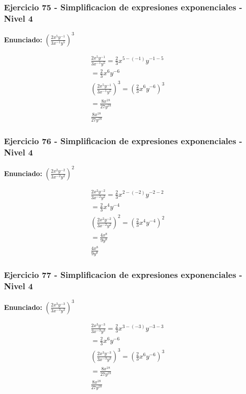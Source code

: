 \documentclass[12pt,a4paper]{article}
\begin{document}
\subsubsection*{Ejercicio 75 - Simplificacion de expresiones exponenciales - Nivel 4}
\textbf{Enunciado:} \(\left(\frac{2x^{5}y^{-1}}{3x^{-1}y^{5}}\right)^{3}\)

\[
\begin{aligned}
\frac{2x^{5}y^{-1}}{3x^{-1}y^{5}}=\frac{2}{3}x^{5-(-1)}y^{-1-5}\\
=\frac{2}{3}x^{6}y^{-6}\\
\left(\frac{2x^{5}y^{-1}}{3x^{-1}y^{5}}\right)^{3}=\left(\frac{2}{3}x^{6}y^{-6}\right)^{3}\\
=\frac{8x^{18}}{27y^{18}}\\
\boxed{\frac{8x^{18}}{27y^{18}}}
\end{aligned}
\]


\subsubsection*{Ejercicio 76 - Simplificacion de expresiones exponenciales - Nivel 4}
\textbf{Enunciado:} \(\left(\frac{2x^{2}y^{-2}}{3x^{-2}y^{2}}\right)^{2}\)

\[
\begin{aligned}
\frac{2x^{2}y^{-2}}{3x^{-2}y^{2}}=\frac{2}{3}x^{2-(-2)}y^{-2-2}\\
=\frac{2}{3}x^{4}y^{-4}\\
\left(\frac{2x^{2}y^{-2}}{3x^{-2}y^{2}}\right)^{2}=\left(\frac{2}{3}x^{4}y^{-4}\right)^{2}\\
=\frac{4x^{8}}{9y^{8}}\\
\boxed{\frac{4x^{8}}{9y^{8}}}
\end{aligned}
\]


\subsubsection*{Ejercicio 77 - Simplificacion de expresiones exponenciales - Nivel 4}
\textbf{Enunciado:} \(\left(\frac{2x^{3}y^{-3}}{3x^{-3}y^{3}}\right)^{3}\)

\[
\begin{aligned}
\frac{2x^{3}y^{-3}}{3x^{-3}y^{3}}=\frac{2}{3}x^{3-(-3)}y^{-3-3}\\
=\frac{2}{3}x^{6}y^{-6}\\
\left(\frac{2x^{3}y^{-3}}{3x^{-3}y^{3}}\right)^{3}=\left(\frac{2}{3}x^{6}y^{-6}\right)^{3}\\
=\frac{8x^{18}}{27y^{18}}\\
\boxed{\frac{8x^{18}}{27y^{18}}}
\end{aligned}
\]
\end{document}
